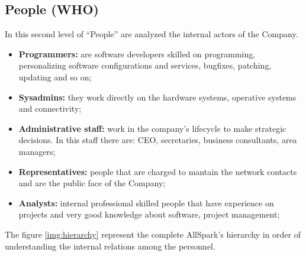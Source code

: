 \subsection{People (WHO)}
\label{subsec:enterprise[People]}
In this second level of ``People'' are analyzed the internal actors of the Company.
\begin{itemize}
 \item {\bf Programmers:} are software developers skilled on programming, personalizing software configurations and services, bugfixes, patching, updating and so on;
 \item {\bf Sysadmins:} they work directly on the hardware systems, operative systems and connectivity;
 \item {\bf Administrative staff:} work in the company's lifecycle to make strategic decisions. In this staff there are: CEO, secretaries, business consultants, area managers;
 \item {\bf Representatives:} people that are charged to mantain the network contacts and are the public face of the Company;
 \item {\bf Analysts:} internal professional skilled people that have experience on projects and very good knowledge about software, project management;
\end{itemize}

The figure \ref{img:hierarchy} represent the complete AllSpark's hierarchy in order of understanding the internal relations among the personnel.

